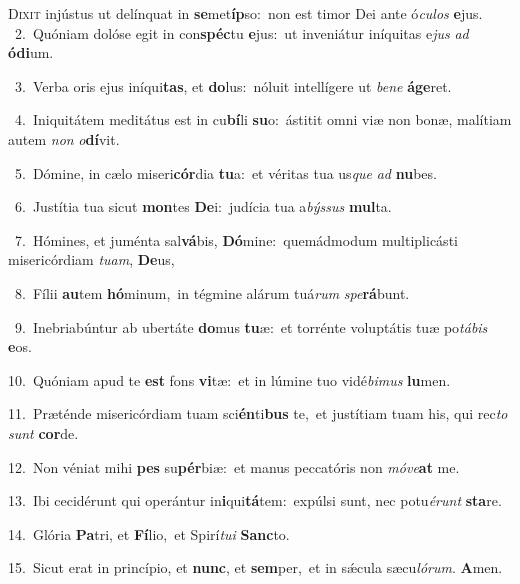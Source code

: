 \lettrine{\initial\textcolor{\initialcolor}{D}}{ixit} injústus ut delínquat in \textbf{se}\-met\-\textbf{íp}\-so:~\star non est timor Dei ante ó\-\textit{cu}\-\textit{los} \textbf{e}\-jus.\\
{\numbfont\textcolor{\numbcolor}{~2.}}~Quóniam dolóse egit in con\-\textbf{spéc}\-tu \textbf{e}\-jus:~\star ut inveniátur iníquitas e\textit{jus} \textit{ad} \textbf{ó}\-\textbf{di}um.\par
{\numbfont\textcolor{\numbcolor}{~3.}}~Verba oris ejus iníqui\-\textbf{tas}\-, et \textbf{do}\-lus:~\star nóluit intellígere ut \textit{be}\-\textit{ne} \textbf{á}\-\textbf{ge}ret.\par
{\numbfont\textcolor{\numbcolor}{~4.}}~Iniquitátem meditátus est in cu\-\textbf{bí}\-li \textbf{su}\-o:~\star ástitit omni viæ non bonæ, malítiam autem \textit{non} \textit{o}\-\textbf{dí}vit.\par
{\numbfont\textcolor{\numbcolor}{~5.}}~Dómine, in cælo miseri\-\textbf{cór}\-dia \textbf{tu}\-a:~\star et véritas tua us\textit{que} \textit{ad} \textbf{nu}\-bes.\par
{\numbfont\textcolor{\numbcolor}{~6.}}~Justítia tua sicut \textbf{mon}\-tes \textbf{De}\-i:~\star judícia tua a\-\textit{býs}\-\textit{sus} \textbf{mul}\-ta.\par
{\numbfont\textcolor{\numbcolor}{~7.}}~Hómines, et juménta sal\-\textbf{vá}\-bis, \textbf{Dó}\-mine:~\star quemádmodum multiplicásti misericórdiam \textit{tu}\-\textit{am}, \textbf{De}\-us,\par
{\numbfont\textcolor{\numbcolor}{~8.}}~Fílii \textbf{au}\-tem \textbf{hó}\-minum,~\star in tégmine alárum tuá\textit{rum} \textit{spe}\-\textbf{rá}bunt.\par
{\numbfont\textcolor{\numbcolor}{~9.}}~Inebriabúntur ab ubertáte \textbf{do}\-mus \textbf{tu}\-æ:~\star et torrénte voluptátis tuæ po\-\textit{tá}\-\textit{bis} \textbf{e}\-os.\par
{\numbfont\textcolor{\numbcolor}{10.}}~Quóniam apud te \textbf{est} fons \textbf{vi}\-tæ:~\star et in lúmine tuo vidé\-\textit{bi}\-\textit{mus} \textbf{lu}\-men.\par
{\numbfont\textcolor{\numbcolor}{11.}}~Præténde misericórdiam tuam sci\-\textbf{én}\-ti\textbf{bus} te,~\star et justítiam tuam his, qui rec\textit{to} \textit{sunt} \textbf{cor}\-de.\par
{\numbfont\textcolor{\numbcolor}{12.}}~Non véniat mihi \textbf{pes} su\-\textbf{pér}\-biæ:~\star et manus peccatóris non \textit{mó}\-\textit{ve}\textbf{at} me.\par
{\numbfont\textcolor{\numbcolor}{13.}}~Ibi cecidérunt qui operántur in\-\textbf{i}\-qui\-\textbf{tá}\-tem:~\star expúlsi sunt, nec potu\-\textit{é}\-\textit{runt} \textbf{sta}\-re.\par
{\numbfont\textcolor{\numbcolor}{14.}}~Glória \textbf{Pa}\-tri, et \textbf{Fí}\-lio,~\star et Spirí\-\textit{tu}\-\textit{i} \textbf{Sanc}\-to.\par
{\numbfont\textcolor{\numbcolor}{15.}}~Sicut erat in princípio, et \textbf{nunc}\-, et \textbf{sem}\-per,~\star et in sǽcula sæcu\-\textit{ló}\-\textit{rum}. \textbf{A}\-men.\par
